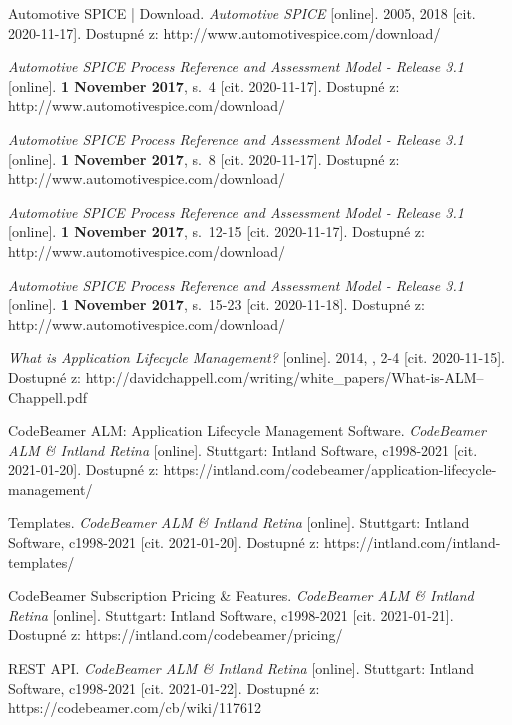 \documentclass[czech,master]{diploma}
\begin{document}
\begin{thebibliography}{43}
Automotive SPICE | Download. \textit{Automotive SPICE} [online]. 2005, 2018 [cit. 2020-11-17]. Dostupné z: http://www.automotivespice.com/download/

\textit{Automotive SPICE Process Reference and Assessment Model - Release 3.1} [online]. \textbf{1 November 2017}, s.~4 [cit. 2020-11-17]. Dostupné z: http://www.automotivespice.com/download/

\textit{Automotive SPICE Process Reference and Assessment Model - Release 3.1} [online]. \textbf{1 November 2017}, s.~8 [cit. 2020-11-17]. Dostupné z: http://www.automotivespice.com/download/

\textit{Automotive SPICE Process Reference and Assessment Model - Release 3.1} [online]. \textbf{1 November 2017}, s.~12-15 [cit. 2020-11-17]. Dostupné z: http://www.automotivespice.com/download/


\textit{Automotive SPICE Process Reference and Assessment Model - Release 3.1} [online]. \textbf{1 November 2017}, s.~15-23 [cit. 2020-11-18]. Dostupné z: http://www.automotivespice.com/download/

\textit{What is Application Lifecycle Management?} [online]. 2014, , 2-4 [cit. 2020-11-15]. Dostupné z: http://davidchappell.com/writing/white\_papers/What-is-ALM--Chappell.pdf

CodeBeamer ALM: Application Lifecycle Management Software. \textit{CodeBeamer ALM \& Intland Retina }[online]. Stuttgart: Intland Software, c1998-2021 [cit. 2021-01-20]. Dostupné z: https://intland.com/codebeamer/application-lifecycle-management/

Templates. \textit{CodeBeamer ALM \& Intland Retina} [online]. Stuttgart: Intland Software, c1998-2021 [cit. 2021-01-20]. Dostupné z: https://intland.com/intland-templates/

CodeBeamer Subscription Pricing \& Features. \textit{CodeBeamer ALM \& Intland Retina} [online]. Stuttgart: Intland Software, c1998-2021 [cit. 2021-01-21]. Dostupné z: https://intland.com/codebeamer/pricing/

REST API. \textit{CodeBeamer ALM \& Intland Retina} [online]. Stuttgart: Intland Software, c1998-2021 [cit. 2021-01-22]. Dostupné z: https://codebeamer.com/cb/wiki/117612


\end{thebibliography}
\end{document}
